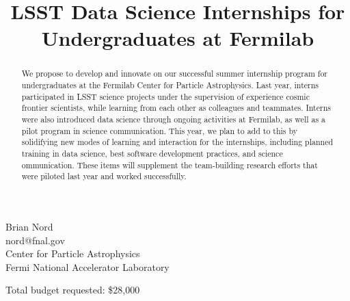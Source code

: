 \title{%
LSST Data Science Internships for Undergraduates at Fermilab}
\date{} %


\maketitle

\vspace{-1.5cm}
\begin{center}
Brian Nord \\ nord@fnal.gov \\
Center for Particle Astrophysics\\
Fermi National Accelerator Laboratory\\
\vspace{0.3cm}
\end{center}
\vspace{1.5cm}

\begin{abstract}
\normalsize
We propose to develop and innovate on our successful summer internship program for undergraduates at the Fermilab Center for Particle Astrophysics.
Last year, interns participated in LSST science projects under the supervision of experience cosmic frontier scientists, while learning from each other as colleagues and teammates.
Interns were also introduced data science through ongoing activities at Fermilab, as well as a pilot program in science communication. 
This year, we plan to add to this by solidifying new modes of learning and interaction for the internships, including planned training in data science, best software development practices, and science ommunication.
These items will supplement the team-building research efforts that were piloted last year and worked successfully.
\end{abstract}

Total budget requested: \$28,000\par

